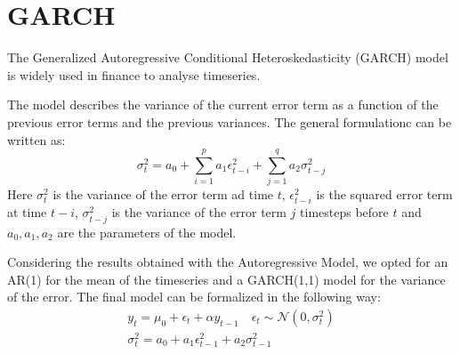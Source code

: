\chapter{GARCH}
\label{GARCH}
The Generalized Autoregressive Conditional Heteroskedasticity (GARCH) model is widely used in finance to analyse timeseries.

The model describes the variance of the current error term as a function of the previous error terms and the previous variances. The general formulationc can be written as:
\begin{equation}
    \sigma^2_t = a_{0} + \sum^{p}_{i=1}a_1 \epsilon^2_{t-i} + \sum^{q}_{j=1}a_2 \sigma^2_{t-j}
\end{equation}
Here $\sigma^2_t$ is the variance of the error term ad time $t$, $\epsilon^2_{t-i}$ is the squared error term at time $t-i$, $\sigma^2_{t-j}$ is the variance of the error term $j$ timesteps before $t$ and $a_0, a_1, a_2$ are the parameters of the model.

Considering the results obtained with the Autoregressive Model, we opted for an AR(1) for the mean of the timeseries and a GARCH(1,1) model for the variance of the error. The final model can be formalized in the following way:
\begin{equation}
    \begin{split}
        y_{t} = \mu_{0} + \epsilon_t + \alpha y_{t-1} \quad \epsilon_t \sim \mathcal{N}(0, \sigma^2_t) \\
        \sigma^2_t = a_{0} + a_1 \epsilon^2_{t-1} + a_2 \sigma^2_{t-1}
    \end{split}
\end{equation}


